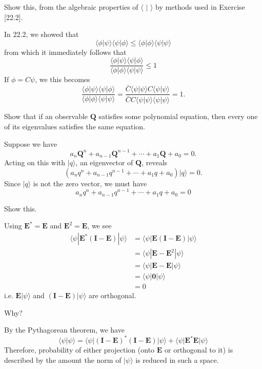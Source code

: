 \documentclass[../road-to-reality.tex]{subfiles}
\begin{document}
\begin{questions}
\question Show this, from the algebraic properties of $\langle\,\,|\,\,\rangle$ by methods used in Exercise [22.2].

\begin{solution}
	In 22.2, we showed that
	\[
		\langle\phi|\psi\rangle\langle\psi|\phi\rangle \leq \langle\phi|\phi\rangle\langle\psi|\psi\rangle
	\]
	from which it immediately follows that
	\[
		\frac{\langle\phi|\psi\rangle\langle\psi|\phi\rangle}{\langle\phi|\phi\rangle\langle\psi|\psi\rangle} \leq 1
	\]
	If $\phi = C\psi$, we this becomes
	\[
		\frac{\langle\phi|\psi\rangle\langle\psi|\phi\rangle}{\langle\phi|\phi\rangle\langle\psi|\psi\rangle} = \frac{\bar{C}\langle\psi|\psi\rangle C\langle\psi|\psi\rangle}{\bar{C}C\langle\psi|\psi\rangle\langle\psi|\psi\rangle} = 1.
	\]
\end{solution}

\question Show that if an observable $\mathbf{Q}$ satisfies some polynomial equation, then every one of its eigenvalues satisfies the same equation.

\begin{solution}
	Suppose we have
	\[
		a_n\mathbf{Q}^n + a_{n-1}\mathbf{Q}^{n-1} + \cdots + a_1\mathbf{Q} + a_0 = 0.
	\]
	Acting on this with $|q\rangle$, an eigenvector of $\mathbf{Q}$, reveals
	\[
		(a_nq^n + a_{n-1}q^{n-1} + \cdots + a_1q + a_0)|q\rangle = 0.
	\]
	Since $|q\rangle$ is not the zero vector, we must have
	\[
		a_nq^n + a_{n-1}q^{n-1} + \cdots + a_1q + a_0 = 0
	\]
\end{solution}

\question Show this.

\begin{solution}
	Using $\mathbf{E}^*=\mathbf{E}$ and $\mathbf{E}^2 = \mathbf{E}$, we see
	\begin{align*}
		\langle\psi|\mathbf{E}^*(\mathbf{I}-\mathbf{E})|\psi\rangle &= \langle\psi|\mathbf{E}(\mathbf{I}-\mathbf{E})|\psi\rangle \\
		&= \langle\psi|\mathbf{E}-\mathbf{E}^2|\psi\rangle \\
		&= \langle\psi|\mathbf{E}-\mathbf{E}|\psi\rangle \\
		&= \langle\psi|\mathbf{0}|\psi\rangle \\
		&= 0
	\end{align*}
	i.e. $\mathbf{E}|\psi\rangle$ and $(\mathbf{I} - \mathbf{E})|\psi\rangle$ are orthogonal.
\end{solution}

\question Why?

\begin{solution}
	By the Pythagorean theorem, we have
	\[
		\langle\psi|\psi\rangle = \langle\psi|(\mathbf{I}-\mathbf{E})^*(\mathbf{I} - \mathbf{E})|\psi\rangle + \langle\psi|\mathbf{E}^*\mathbf{E}|\psi\rangle
	\]
	Therefore, probability of either projection (onto $\mathbf{E}$ or orthogonal to it) is described by the amount the norm of $|\psi\rangle$ is reduced in such a space.
\end{solution}
	

\end{questions}
\end{document}
